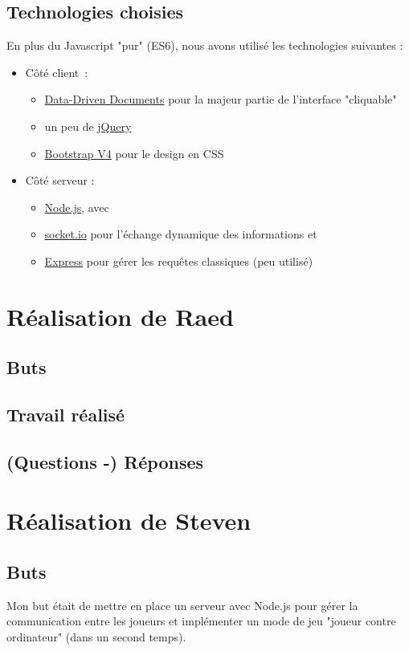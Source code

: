 \documentclass[a4paper, 11pt]{article}
\begin{document}
\subsection{Technologies choisies}
En plus du Javascript "pur" (ES6), nous avons utilisé les technologies suivantes :
\begin{itemize}
	\item Côté client :
	\begin{itemize}
		\item \href{https://d3js.org/}{Data-Driven Documents} pour la majeur partie de l'interface "cliquable"
		\item un peu de \href{https://jquery.org/}{jQuery}
		\item \href{http://getbootstrap.com/}{Bootstrap V4} pour le design en CSS
	\end{itemize}
	\item Côté serveur :
	\begin{itemize}
		\item \href{https://nodejs.org/en/}{Node.js}, avec
		\item \href{https://socket.io/}{socket.io} pour l'échange dynamique des informations et
		\item \href{http://expressjs.com/}{Express} pour gérer les requêtes classiques (peu utilisé)
	\end{itemize}
\end{itemize}

\section{Réalisation de Raed}
\subsection{Buts}
\subsection{Travail réalisé}
\subsection{(Questions -) Réponses}

\section{Réalisation de Steven}
\subsection{Buts}
Mon but était de mettre en place un serveur avec Node.js pour gérer la communication entre les joueurs et implémenter un mode de jeu "joueur contre ordinateur" (dans un second temps).
\end{document}
